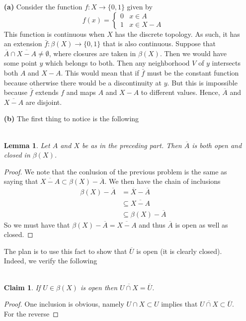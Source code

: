 \documentclass{article}
\newcommand{\exercise}[1]{\noindent{\textbf{Exercise #1:}}}
\newtheorem*{lem}{\\ Lemma}
\newtheorem*{claim}{\\ Claim}
\begin{document}
\exercise{38.7}
\begin{enumerate}
\item [\textbf{(a)}] Consider the function $f: X \to \{0,1\}$ given by
  \[
  f(x) =
  \begin{cases}
    0 & x \in A \\
    1 & x \in X - A
  \end{cases}
  \]
  This function is continuous when $X$ has the discrete topology. As
  such, it has an extension $\bar{f}: \beta(X) \to \{0,1\}$ that is
  also continuous. Suppose that $\overline{A} \cap \overline{X-A} \neq
  \emptyset$, where closures are taken in $\beta(X)$. Then we would
  have some point $y$ which belongs to both. Then any neighborhood $V$
  of $y$ intersects both $A$ and $X-A$. This would mean that if
  $\bar{f}$ must be the constant function because otherwise there
  would be a discontinuity at $y$. But this is impossible because
  $\bar{f}$ extends $f$ and maps $A$ and $X-A$ to different
  values. Hence, $\overline{A}$ and $\overline{X-A}$ are disjoint.
\item [\textbf{(b)}] The first thing to notice is the following
  \begin{lem}
    Let $A$ and $X$ be as in the preceding part. Then $\overline{A}$
    is both open and closed in $\beta(X)$.
  \end{lem}
  \begin{proof}
    We note that the conlusion of the previous problem is the same as
    saying that $\overline{X-A} \subset \beta(X) - \overline{A}$. We
    then have the chain of inclusions
    \begin{align*}
      \beta(X) - \overline{A} &= \overline{X} - \overline{A} \\
      &\subseteq \overline{X-A} \\
      &\subseteq \beta(X) - \overline{A}
    \end{align*}
    So we must have that $\beta(X) - \overline{A} = \overline{X-A}$
    and thus $\overline{A}$ is open as well as closed.
  \end{proof}
  The plan is to use this fact to show that $\overline{U}$ is open (it
  is clearly closed). Indeed, we verify the following
  \begin{claim}
    If $U \in \beta(X)$ is open then $\overline{U\cap X} = \overline{U}$.
  \end{claim}
  \begin{proof}
    One inclusion is obvious, namely $U \cap X \subset U$ implies that
    $\overline{U \cap X} \subset \overline{U}$. For the reverse

\end{proof}
\end{enumerate}
\end{document}
